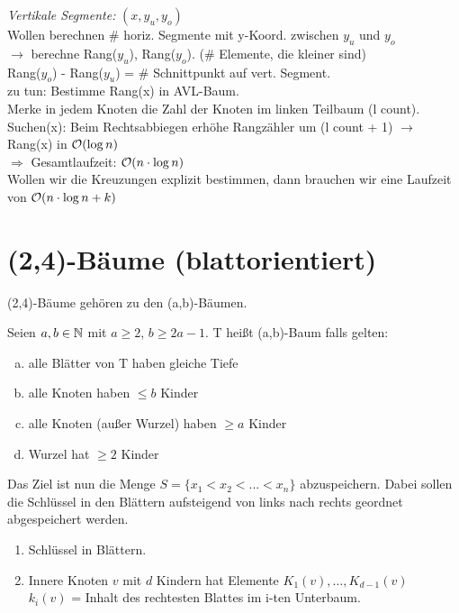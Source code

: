                 \emph{Vertikale Segmente:} $(x, y_{u}, y_{o})$\\
                Wollen berechnen \# horiz. Segmente mit y-Koord. zwischen $y_{u}$ und $y_{o}$\\
                $\rightarrow$ berechne Rang($y_{u}$), Rang($y_{o}$). (\# Elemente, die kleiner sind)\\
                Rang($y_{o}$) - Rang($y_{u}$) = \# Schnittpunkt auf vert. Segment.\\
                zu tun: Bestimme Rang(x) in AVL-Baum.\\

                Merke in jedem Knoten die Zahl der Knoten im linken Teilbaum (l count).\\
                Suchen(x): Beim Rechtsabbiegen erhöhe Rangzähler um (l count + 1) $\rightarrow$ Rang(x) in $\mathcal{O}(\log n)$\\
                $\Rightarrow$ Gesamtlaufzeit: $\mathcal{O}(n \cdot \log n)$ \\
                Wollen wir die Kreuzungen explizit bestimmen, dann brauchen wir eine Laufzeit von $\mathcal{O}(n \cdot \log n + k)$

    \section{(2,4)-Bäume (blattorientiert)}
        (2,4)-Bäume gehören zu den (a,b)-Bäumen.
        
        \begin{definition}
            Seien $a,b \in \mathbb{N}$ mit $a \geq 2$, $b \geq 2a-1$. T heißt (a,b)-Baum falls gelten:
            \begin{enumerate}[a)]
                \item alle Blätter von T haben gleiche Tiefe
                \item alle Knoten haben $\leq b$ Kinder
                \item alle Knoten (außer Wurzel) haben $\geq a$ Kinder
                \item Wurzel hat $\geq 2$ Kinder
            \end{enumerate}
        \end{definition}
        
        Das Ziel ist nun die Menge $S = \{x_1 < x_2 < ... < x_n\}$ abzuspeichern. Dabei sollen die Schlüssel in den Blättern aufsteigend von links
        nach rechts geordnet abgespeichert werden.
        
        \begin{enumerate}[1.]
            \item Schlüssel in Blättern.
            \item Innere Knoten $v$ mit $d$ Kindern hat Elemente $K_1(v), \ldots, K_{d-1}(v)$ \\
            $k_i(v)$ = Inhalt des rechtesten Blattes im i-ten Unterbaum. 
        \end{enumerate}


